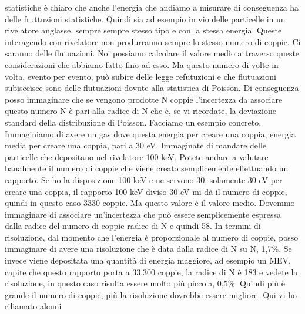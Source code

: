 {statistiche è chiaro che anche l'energia che andiamo a misurare di conseguenza ha delle fruttuzioni statistiche. Quindi sia ad esempio in vio delle particelle in un rivelatore anglasse, sempre sempre stesso tipo e con la stessa energia. Queste interagendo con rivelatore non produrranno sempre lo stesso numero di coppie. Ci saranno delle flutuazioni. Noi possiamo calcolare il valore medio attraverso queste considerazioni che abbiamo fatto fino ad esso. Ma questo numero di volte in volta, evento per evento, può subire delle legge refutuzioni e che flutuazioni subisceïsce sono delle flutuazioni dovute alla statistica di Poisson. Di conseguenza posso immaginare che se vengono prodotte N coppie l'incertezza da associare questo numero N è pari alla radice di N che è, se vi ricordate, la deviazione standard della distribuzione di Poisson. Facciamo un esempio concreto. Immaginiamo di avere un gas dove questa energia per creare una coppia, energia media per creare una coppia, pari a 30 eV. Immaginate di mandare delle particelle che depositano nel rivelatore 100 keV. Potete andare a valutare banalmente il numero di coppie che viene creato semplicemente effettuando un rapporto. Se ho la disposizione 100 keV e ne servono 30, solamente 30 eV per creare una coppia, il rapporto 100 keV diviso 30 eV mi dà il numero di coppie, quindi in questo caso 3330 coppie. Ma questo valore è il valore medio. Dovemmo immaginare di associare un'incertezza che può essere semplicemente espressa dalla radice del numero di coppie radice di N e quindi 58. In termini di risoluzione, dal momento che l'energia è proporzionale al numero di coppie, posso immaginare di avere una risoluzione che è data dalla radice di N su N, 1,7\%. Se invece viene depositata una quantità di energia maggiore, ad esempio un MEV, capite che questo rapporto porta a 33.300 coppie, la radice di N è 183 e vedete la risoluzione, in questo caso risulta essere molto più piccola, 0,5\%. Quindi più è grande il numero di coppie, più la risoluzione dovrebbe essere migliore. Qui vi ho riliamato alcuni 

}
